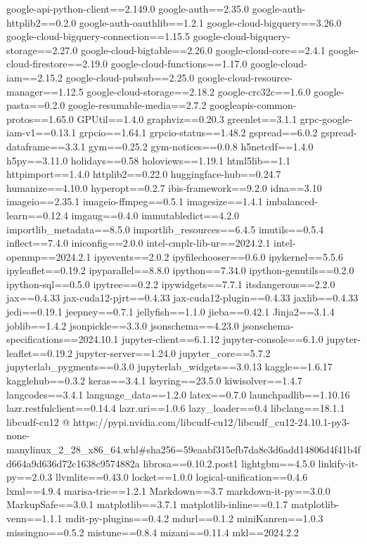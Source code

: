 google-api-python-client==2.149.0
google-auth==2.35.0
google-auth-httplib2==0.2.0
google-auth-oauthlib==1.2.1
google-cloud-bigquery==3.26.0
google-cloud-bigquery-connection==1.15.5
google-cloud-bigquery-storage==2.27.0
google-cloud-bigtable==2.26.0
google-cloud-core==2.4.1
google-cloud-firestore==2.19.0
google-cloud-functions==1.17.0
google-cloud-iam==2.15.2
google-cloud-pubsub==2.25.0
google-cloud-resource-manager==1.12.5
google-cloud-storage==2.18.2
google-crc32c==1.6.0
google-pasta==0.2.0
google-resumable-media==2.7.2
googleapis-common-protos==1.65.0
GPUtil==1.4.0
graphviz==0.20.3
greenlet==3.1.1
grpc-google-iam-v1==0.13.1
grpcio==1.64.1
grpcio-status==1.48.2
gspread==6.0.2
gspread-dataframe==3.3.1
gym==0.25.2
gym-notices==0.0.8
h5netcdf==1.4.0
h5py==3.11.0
holidays==0.58
holoviews==1.19.1
html5lib==1.1
httpimport==1.4.0
httplib2==0.22.0
huggingface-hub==0.24.7
humanize==4.10.0
hyperopt==0.2.7
ibis-framework==9.2.0
idna==3.10
imageio==2.35.1
imageio-ffmpeg==0.5.1
imagesize==1.4.1
imbalanced-learn==0.12.4
imgaug==0.4.0
immutabledict==4.2.0
importlib_metadata==8.5.0
importlib_resources==6.4.5
imutils==0.5.4
inflect==7.4.0
iniconfig==2.0.0
intel-cmplr-lib-ur==2024.2.1
intel-openmp==2024.2.1
ipyevents==2.0.2
ipyfilechooser==0.6.0
ipykernel==5.5.6
ipyleaflet==0.19.2
ipyparallel==8.8.0
ipython==7.34.0
ipython-genutils==0.2.0
ipython-sql==0.5.0
ipytree==0.2.2
ipywidgets==7.7.1
itsdangerous==2.2.0
jax==0.4.33
jax-cuda12-pjrt==0.4.33
jax-cuda12-plugin==0.4.33
jaxlib==0.4.33
jedi==0.19.1
jeepney==0.7.1
jellyfish==1.1.0
jieba==0.42.1
Jinja2==3.1.4
joblib==1.4.2
jsonpickle==3.3.0
jsonschema==4.23.0
jsonschema-specifications==2024.10.1
jupyter-client==6.1.12
jupyter-console==6.1.0
jupyter-leaflet==0.19.2
jupyter-server==1.24.0
jupyter_core==5.7.2
jupyterlab_pygments==0.3.0
jupyterlab_widgets==3.0.13
kaggle==1.6.17
kagglehub==0.3.2
keras==3.4.1
keyring==23.5.0
kiwisolver==1.4.7
langcodes==3.4.1
language_data==1.2.0
latex==0.7.0
launchpadlib==1.10.16
lazr.restfulclient==0.14.4
lazr.uri==1.0.6
lazy_loader==0.4
libclang==18.1.1
libcudf-cu12 @ https://pypi.nvidia.com/libcudf-cu12/libcudf_cu12-24.10.1-py3-none-manylinux_2_28_x86_64.whl#sha256=59eaabf315efb7da8e3d6add14806d4f41b4fd664a9d636d72c1638c9574882a
librosa==0.10.2.post1
lightgbm==4.5.0
linkify-it-py==2.0.3
llvmlite==0.43.0
locket==1.0.0
logical-unification==0.4.6
lxml==4.9.4
marisa-trie==1.2.1
Markdown==3.7
markdown-it-py==3.0.0
MarkupSafe==3.0.1
matplotlib==3.7.1
matplotlib-inline==0.1.7
matplotlib-venn==1.1.1
mdit-py-plugins==0.4.2
mdurl==0.1.2
miniKanren==1.0.3
missingno==0.5.2
mistune==0.8.4
mizani==0.11.4
mkl==2024.2.2
